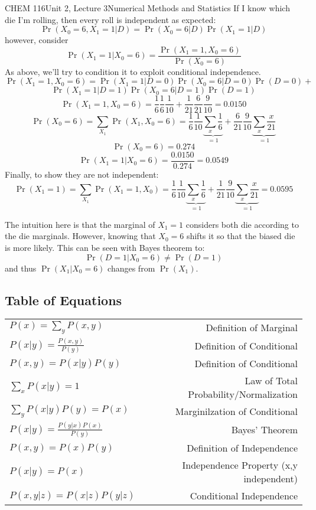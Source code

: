 \documentclass{article}
\begin{document}
\begin{tdoc}{CHEM 116}{Unit 2, Lecture 3}{Numerical Methods and Statistics}
If I know which die I'm rolling, then every roll is independent
as expected:
\[
\Pr (X_0 = 6, X_1 = 1 | D) = \Pr (X_0 = 6 | D) \Pr (X_1 = 1 | D)
\]
however, consider
\[
\Pr (X_1 = 1 | X_0 = 6) = \frac{\Pr(X_1 = 1, X_0 = 6)}{\Pr (X_0 = 6)}
\]
As above, we'll try to condition it to exploit conditional
independence.
\[
\Pr(X_1 = 1, X_0 = 6) = \Pr(X_1 = 1 | D = 0) \Pr(X_0 = 6 | D = 0) \Pr (D = 0) +
\]
\[
\Pr(X_1 = 1 | D = 1) \Pr(X_0 = 6 | D = 1) \Pr (D = 1)
\]
\[
\Pr(X_1 = 1, X_0 = 6) = \frac{1}{6}\frac{1}{6}\frac{1}{10} + \frac{1}{21}\frac{6}{21}\frac{9}{10} = 0.0150
\]
\[
\Pr(X_0 = 6) = \sum_{X_1} \Pr(X_1, X_0 = 6) = \frac{1}{6}\frac{1}{10}\underbrace{\sum_{x} \frac{1}{6}}_{=1} + \frac{6}{21}\frac{9}{10} \underbrace{\sum_{x} \frac{x}{21}}_{=1}
\]
\[
\Pr(X_0 = 6)  = 0.274
\]
\[
\Pr (X_1 = 1 | X_0 = 6) = \frac{0.0150}{0.274} = 0.0549
\]
Finally, to show they are not independent:
\[
\Pr(X_1 = 1) = \sum_{X_1} \Pr(X_1 = 1, X_0) = \frac{1}{6}\frac{1}{10}\underbrace{\sum_{x} \frac{1}{6}}_{=1} + \frac{1}{21}\frac{9}{10} \underbrace{\sum_{x} \frac{x}{21}}_{=1} = 0.0595
\]

The intuition here is that the marginal of $X_1 = 1$ considers both
die according to the die marginals. However, knowing that $X_0 = 6$
shifts it so that the biased die is more likely. This can be seen with
Bayes theorem to:
\[
\Pr(D = 1 | X_0 = 6) \neq \Pr (D=1)
\]
and thus $\Pr (X_1 | X_0 = 6)$ changes from $\Pr(X_1)$.

\subsection{Table of Equations}

  \begin{tabular}{lr}
    $P(x) = \sum_y P(x,y)$ & Definition of Marginal\vspace{0.15cm}\\
    $P(x|y) = \frac{P(x,y)}{P(y)}$ & Definition of Conditional\vspace{0.15cm}\\
    $P(x,y) = P(x|y)P(y)$ & Definition of Conditional\vspace{0.15cm}\\
    $\sum_x P(x|y) = 1$ & Law of Total Probability/Normalization\vspace{0.15cm}\\
    $\sum_y P(x|y)P(y) = P(x)$ & Marginilzation of Conditional\vspace{0.15cm}\\
    $P(x|y) = \frac{P(y|x)P(x)}{P(y)}$ & Bayes' Theorem\vspace{0.15cm}\\
    $P(x,y) = P(x)P(y)$ & Definition of Independence\vspace{0.15cm}\\
    $P(x | y) = P(x)$ & Independence Property (x,y independent)\vspace{0.15cm}\\
    $P(x,y | z) = P(x|z)P(y|z)$ & Conditional Independence\vspace{0.15cm}\\
  \end{tabular}

\end{tdoc}
\end{document}
